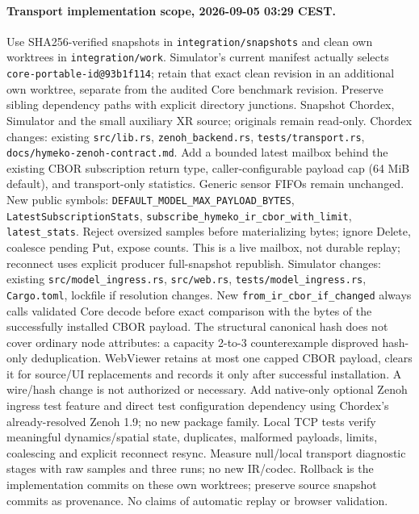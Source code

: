 \documentclass[10pt,a4paper]{article}
\begin{document}
\paragraph{Transport implementation scope, 2026-09-05 03:29 CEST.}
Use SHA256-verified snapshots in \texttt{integration/snapshots} and clean own
worktrees in \texttt{integration/work}. Simulator's current manifest actually
selects \texttt{core-portable-id@93b1f114}; retain that exact clean revision in
an additional own worktree, separate from the audited Core benchmark revision.
Preserve sibling dependency paths with explicit directory junctions. Snapshot
Chordex, Simulator and the small auxiliary XR source; originals remain read-only.
Chordex changes: existing \texttt{src/lib.rs}, \texttt{zenoh\_backend.rs}, \texttt{tests/transport.rs},
\texttt{docs/hymeko-zenoh-contract.md}. Add a bounded latest mailbox behind the
existing CBOR subscription return type, caller-configurable payload cap (64 MiB
default), and transport-only statistics. Generic sensor FIFOs remain unchanged.
New public symbols: \texttt{DEFAULT\_MODEL\_MAX\_PAYLOAD\_BYTES},
\texttt{LatestSubscriptionStats}, \texttt{subscribe\_hymeko\_ir\_cbor\_with\_limit},
\texttt{latest\_stats}. Reject oversized samples before materializing bytes;
ignore Delete, coalesce pending Put, expose counts. This is a live mailbox,
not durable replay; reconnect uses explicit producer full-snapshot republish.
Simulator changes: existing \texttt{src/model\_ingress.rs}, \texttt{src/web.rs},
\texttt{tests/model\_ingress.rs}, \texttt{Cargo.toml}, lockfile if resolution changes.
New \texttt{from\_ir\_cbor\_if\_changed} always calls validated Core decode before
exact comparison with the bytes of the successfully installed CBOR payload.
The structural canonical hash does not cover ordinary node attributes: a capacity
2-to-3 counterexample disproved hash-only deduplication. WebViewer retains at most
one capped CBOR payload, clears it for source/UI replacements and records it only
after successful installation. A wire/hash change is not authorized or necessary.
Add
native-only optional Zenoh ingress test feature and direct test configuration
dependency using Chordex's already-resolved Zenoh 1.9; no new package family.
Local TCP tests verify meaningful dynamics/spatial state, duplicates, malformed
payloads, limits, coalescing and explicit reconnect resync. Measure null/local
transport diagnostic stages with raw samples and three runs; no new IR/codec.
Rollback is the implementation commits on these own worktrees; preserve source
snapshot commits as provenance. No claims of automatic replay or browser validation.
\end{document}
